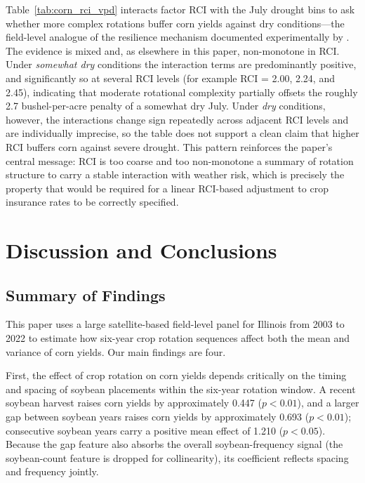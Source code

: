 \documentclass[12pt,letterpaper]{article}
\theoremstyle{remark}
\theoremstyle{remark}
\theoremstyle{plain}
\theoremstyle{definition}
\begin{document}
Table~\ref{tab:corn_rci_vpd} interacts factor RCI with the July drought bins to
ask whether more complex rotations buffer corn yields against dry conditions---the
field-level analogue of the resilience mechanism documented experimentally by
\citet{bowles2020}. The evidence is mixed and, as elsewhere in this paper,
non-monotone in RCI. Under \emph{somewhat dry} conditions the interaction terms
are predominantly positive, and significantly so at several RCI levels (for
example RCI = 2.00, 2.24, and 2.45), indicating that moderate rotational
complexity partially offsets the roughly 2.7 bushel-per-acre penalty of a
somewhat dry July. Under \emph{dry} conditions, however, the interactions change
sign repeatedly across adjacent RCI levels and are individually imprecise, so the
table does not support a clean claim that higher RCI buffers corn against severe
drought. This pattern reinforces the paper's central message: RCI is too coarse
and too non-monotone a summary of rotation structure to carry a stable
interaction with weather risk, which is precisely the property that would be
required for a linear RCI-based adjustment to crop insurance rates to be
correctly specified.

\section{\label{sec:conclusions}Discussion and Conclusions}

\subsection{\label{susec:summary}Summary of Findings}
 
This paper uses a large satellite-based field-level panel for Illinois from 2003 to 2022 to estimate how six-year crop rotation sequences affect both the mean and variance of corn yields. Our main findings are four.
 
First, the effect of crop rotation on corn yields depends critically on the timing and spacing of soybean placements within the six-year rotation window. A recent soybean harvest raises corn yields by approximately 0.447 ($p<0.01$), and a larger gap between soybean years raises corn yields by approximately 0.693 ($p<0.01$); consecutive soybean years carry a positive mean effect of 1.210 ($p<0.05$). Because the gap feature also absorbs the overall soybean-frequency signal (the soybean-count feature is dropped for collinearity), its coefficient reflects spacing and frequency jointly.
\end{document}

